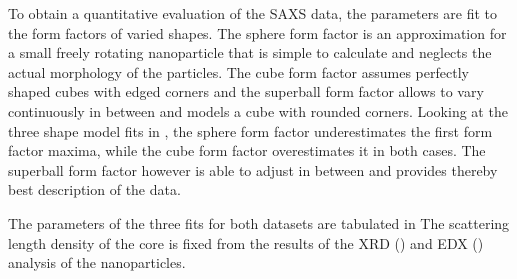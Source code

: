 \documentclass[\main/dresen_thesis.tex]{subfiles}
\begin{document}
    To obtain a quantitative evaluation of the SAXS data, the parameters are fit to the form factors of varied shapes.
    The sphere form factor is an approximation for a small freely rotating nanoparticle that is simple to calculate and neglects the actual morphology of the particles.
    The cube form factor assumes perfectly shaped cubes with edged corners and the superball form factor allows to vary continuously in between and models a cube with rounded corners.
    Looking at the three shape model fits in , the sphere form factor underestimates the first form factor maxima, while the cube form factor overestimates it in both cases.
    The superball form factor however is able to adjust in between and provides thereby best description of the data.

    The parameters of the three fits for both datasets are tabulated in 
    The scattering length density of the core is fixed from the results of the XRD () and EDX () analysis of the nanoparticles.
\end{document}
